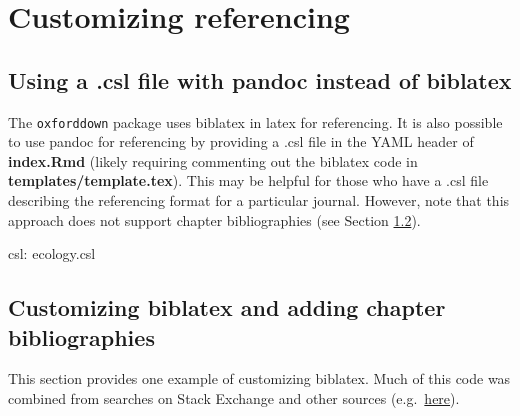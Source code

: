 \documentclass[a4paper, twoside]{templates/ociamthesis}
\newenvironment{Shaded}{\begin{snugshade}}{\end{snugshade}}
\newcommand{\AttributeTok}[1]{\textcolor[rgb]{0.77,0.63,0.00}{#1}}
\newcommand{\FunctionTok}[1]{\textcolor[rgb]{0.00,0.00,0.00}{#1}}
\renewenvironment{Shaded}
{
  \vspace{4pt}%
  \begin{snugshade}%
}{%
  \end{snugshade}%
  \vspace{4pt}%
}
\begin{document}
\newpage \begin{center}  \end{center} \newpage \begin{center}  \end{center}

\hypertarget{customizing-referencing}{%
\section{Customizing referencing}\label{customizing-referencing}}

\hypertarget{using-a-.csl-file-with-pandoc-instead-of-biblatex}{%
\subsection{Using a .csl file with pandoc instead of biblatex}\label{using-a-.csl-file-with-pandoc-instead-of-biblatex}}

The \texttt{oxforddown} package uses biblatex in latex for referencing.
It is also possible to use pandoc for referencing by providing a .csl file in the YAML header of \textbf{index.Rmd} (likely requiring commenting out the biblatex code in \textbf{templates/template.tex}).
This may be helpful for those who have a .csl file describing the referencing format for a particular journal.
However, note that this approach does not support chapter bibliographies (see Section \ref{biblatex-custom}).

\begin{Shaded}
\begin{Highlighting}[]
\FunctionTok{csl:}\AttributeTok{ ecology.csl}
\end{Highlighting}
\end{Shaded}

\hypertarget{biblatex-custom}{%
\subsection{Customizing biblatex and adding chapter bibliographies}\label{biblatex-custom}}

This section provides one example of customizing biblatex. Much of this code was combined from searches on Stack Exchange and other sources (e.g.~\href{https://tex.stackexchange.com/questions/10682/suppress-in-biblatex}{here}).
\end{document}
